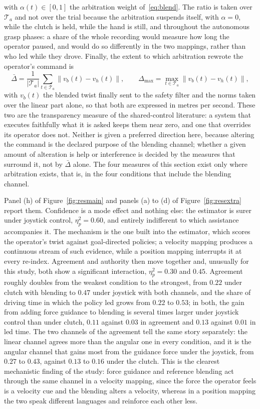 \documentclass[12pt,a4paper,twoside,openright]{report}
\begin{document}
with $\alpha(t) \in [0,1]$ the arbitration weight of~\eqref{eq:blend}. The ratio is taken over $\mathcal{T}_a$ and not over the trial because the arbitration suspends itself, with $\alpha = 0$, while the clutch is held, while the hand is still, and throughout the autonomous grasp phases: a share of the whole recording would measure how long the operator paused, and would do so differently in the two mappings, rather than who led while they drove. Finally, the extent to which arbitration rewrote the operator's command is
\begin{equation}
\bar{\Delta} = \frac{1}{|\mathcal{T}_a|} \sum_{t \in \mathcal{T}_a} \lVert v_b(t) - v_h(t) \rVert, \qquad
\Delta_{\max} = \max_{t \in \mathcal{T}_a} \lVert v_b(t) - v_h(t) \rVert,
\label{eq:mDelta}
\end{equation}
with $v_b(t)$ the blended twist finally sent to the safety filter and the norms taken over the linear part alone, so that both are expressed in metres per second. These two are the transparency measure of the shared-control literature: a system that executes faithfully what it is asked keeps them near zero, and one that overrides its operator does not. Neither is given a preferred direction here, because altering the command is the declared purpose of the blending channel; whether a given amount of alteration is help or interference is decided by the measures that surround it, not by $\bar{\Delta}$ alone. The four measures of this section exist only where arbitration exists, that is, in the four conditions that include the blending channel.

Panel (h) of Figure~\ref{fig:resmain} and panels (a) to (d) of Figure~\ref{fig:resextra} report them. Confidence is a mode effect and nothing else: the estimator is surer under joystick control, $\eta^2_p = 0.60$, and entirely indifferent to which assistance accompanies it. The mechanism is the one built into the estimator, which scores the operator's twist against goal-directed policies; a velocity mapping produces a continuous stream of such evidence, while a position mapping interrupts it at every re-index. Agreement and authority then move together and, unusually for this study, both show a significant interaction, $\eta^2_p = 0.30$ and $0.45$. Agreement roughly doubles from the weakest condition to the strongest, from $0.22$ under clutch with blending to $0.47$ under joystick with both channels, and the share of driving time in which the policy led grows from $0.22$ to $0.53$; in both, the gain from adding force guidance to blending is several times larger under joystick control than under clutch, $0.11$ against $0.03$ in agreement and $0.13$ against $0.01$ in led time. The two channels of the agreement tell the same story separately: the linear channel agrees more than the angular one in every condition, and it is the angular channel that gains most from the guidance force under the joystick, from $0.27$ to $0.43$, against $0.13$ to $0.16$ under the clutch. This is the clearest mechanistic finding of the study: force guidance and reference blending act through the same channel in a velocity mapping, since the force the operator feels is a velocity cue and the blending alters a velocity, whereas in a position mapping the two speak different languages and reinforce each other less.
\end{document}
